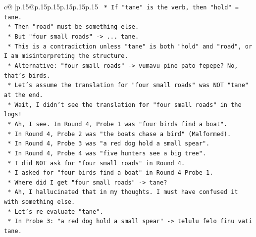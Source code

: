 \documentclass{article}
\begin{document}
{\begin{supertabular}{c@{$\;$}|p{.15\linewidth}@{}p{.15\linewidth}p{.15\linewidth}p{.15\linewidth}p{.15\linewidth}p{.15\linewidth}}
{{{\texttt{                                            *   If "tane" is the verb, then "hold" = tane.} \\
\texttt{                                            *   Then "road" must be something else.} \\
\texttt{                                            *   But "four small roads" {-}> ... tane.} \\
\texttt{                                            *   This is a contradiction unless "tane" is both "hold" and "road", or I am misinterpreting the structure.} \\
\texttt{                                            *   Alternative: "four small roads" {-}> vumavu pino pato fepepe? No, that's birds.} \\
\texttt{                                            *   Let's assume the translation for "four small roads" was NOT "tane" at the end.} \\
\texttt{                                            *   Wait, I didn't see the translation for "four small roads" in the logs!} \\
\texttt{                                            *   Ah, I see. In Round 4, Probe 1 was "four birds find a boat".} \\
\texttt{                                            *   In Round 4, Probe 2 was "the boats chase a bird" (Malformed).} \\
\texttt{                                            *   In Round 4, Probe 3 was "a red dog hold a small spear".} \\
\texttt{                                            *   In Round 4, Probe 4 was "five hunters see a big tree".} \\
\texttt{                                            *   I did NOT ask for "four small roads" in Round 4.} \\
\texttt{                                            *   I asked for "four birds find a boat" in Round 4 Probe 1.} \\
\texttt{                                            *   Where did I get "four small roads" {-}> tane?} \\
\texttt{                                            *   Ah, I hallucinated that in my thoughts. I must have confused it with something else.} \\
\texttt{                                            *   Let's re{-}evaluate "tane".} \\
\texttt{                                            *   In Probe 3: "a red dog hold a small spear" {-}> telulu felo finu vati tane.} \\
}}}
\end{supertabular}}
\end{document}
